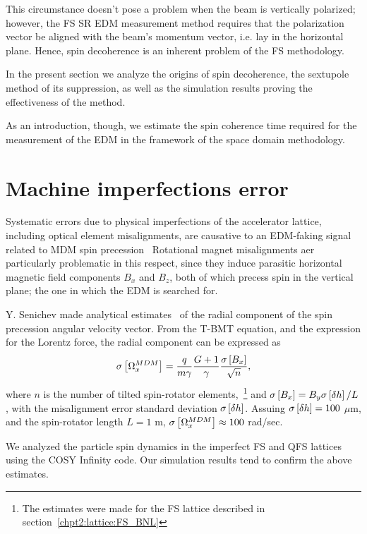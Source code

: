 This circumstance doesn't pose a problem when the beam is vertically polarized;
however, the FS SR EDM measurement method requires that the polarization vector be aligned with
the beam's momentum vector, i.e. lay in the horizontal plane. Hence, spin decoherence is an
inherent problem of the FS methodology.

In the present section we analyze the origins of spin decoherence,
the sextupole method of its suppression, as well as the simulation results
proving the effectiveness of the method.

As an introduction, though, we estimate the spin coherence time required for
the measurement of the EDM in the framework of the space domain methodology.



\section{Machine imperfections error}\label{chpt3:imperfections}
Systematic errors due to physical imperfections of the accelerator lattice, including
optical element misalignments, are causative to an EDM-faking signal 
related to MDM spin precession~\cite[p.~230]{Eremey:Thesis} Rotational magnet misalignments 
aer particularly problematic in this respect, since they induce parasitic horizontal magnetic field
components $B_x$ and $B_z$, both of which precess spin in the vertical plane; the one in which
the EDM is searched for.

Y. Senichev made analytical estimates~\cite{Senichev:FDM}  of the radial component of
the spin precession angular velocity vector. From the T-BMT equation, and the expression for
the Lorentz force, the radial component can be expressed as 
\begin{equation}
\SD{\W_x^{MDM}} = \frac{q}{m\gamma}\frac{G+1}{\gamma}\frac{\SD{B_x}}{\sqrt{n}},
\end{equation}
where $n$ is the number of tilted spin-rotator elements,~\footnote{The estimates were made for
the FS lattice described in section~\ref{chpt2:lattice:FS_BNL}} and $\SD{B_x} = B_y \SD{\delta h}/L$, 
with the misalignment error standard deviation $\SD{\delta h}$. Assuing $\SD{\delta h} = 100$ $\mu$m, 
and the spin-rotator length $L=1$ m, $\SD{\W_x^{MDM}} \approx 100$ rad/sec.~\cite{Senichev:FDM}

We analyzed the particle spin dynamics in the imperfect FS and QFS lattices using the COSY Infinity code. 
Our simulation results tend to confirm the above estimates.

